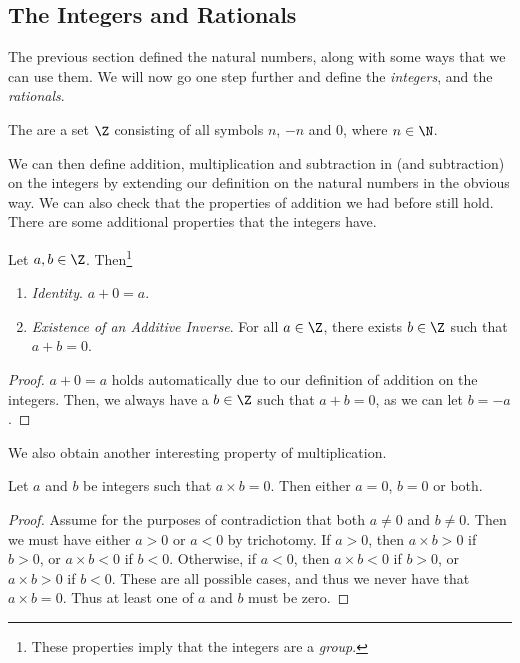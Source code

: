 \subsection{The Integers and Rationals}

The previous section defined the natural numbers, along with some ways that we can use them. We will now go one step further and define the \emph{integers}, and the \emph{rationals}.

\begin{definition}[Integers]
	The  are a set $\Z$ consisting of all symbols $n$, $-n$ and 0, where $n \in \N$. 
\end{definition}

We can then define addition, multiplication and subtraction in (and subtraction) on the integers by extending our definition on the natural numbers in the obvious way. We can also check that the properties of addition we had before still hold. There are some additional properties that the integers have.

\begin{proposition}
	Let $a, b \in \Z$. Then\footnote{These properties imply that the integers are a \emph{group}.}
	\begin{enumerate}[label=(\roman*)]
		\item \emph{Identity}. $a + 0 = a$.
		\item \emph{Existence of an Additive Inverse}. For all $a \in \Z$, there exists $b \in \Z$ such that $a + b = 0$.
	\end{enumerate}
\end{proposition}
\begin{proof}
	$a + 0 = a$ holds automatically due to our definition of addition on the integers. Then, we always have a $b \in \Z$ such that $a + b = 0$, as we can let $b = -a$.
\end{proof}

We also obtain another interesting property of multiplication.

\begin{proposition}
	Let $a$ and $b$ be integers such that $a \times b = 0$. Then either $a = 0$, $b = 0$ or both.
\end{proposition}
\begin{proof}
	Assume for the purposes of contradiction that both $a \neq 0$ and $b \neq 0$. Then we must have either $a > 0$ or $a < 0$ by trichotomy. If $a > 0$, then $a \times b > 0$ if $b > 0$, or $a \times b < 0$ if $b < 0$. Otherwise, if $a < 0$, then $a \times b < 0$ if $b > 0$, or $a \times b > 0$ if $b < 0$. These are all possible cases, and thus we never have that $a \times b = 0$. Thus at least one of $a$ and $b$ must be zero. 
\end{proof}

